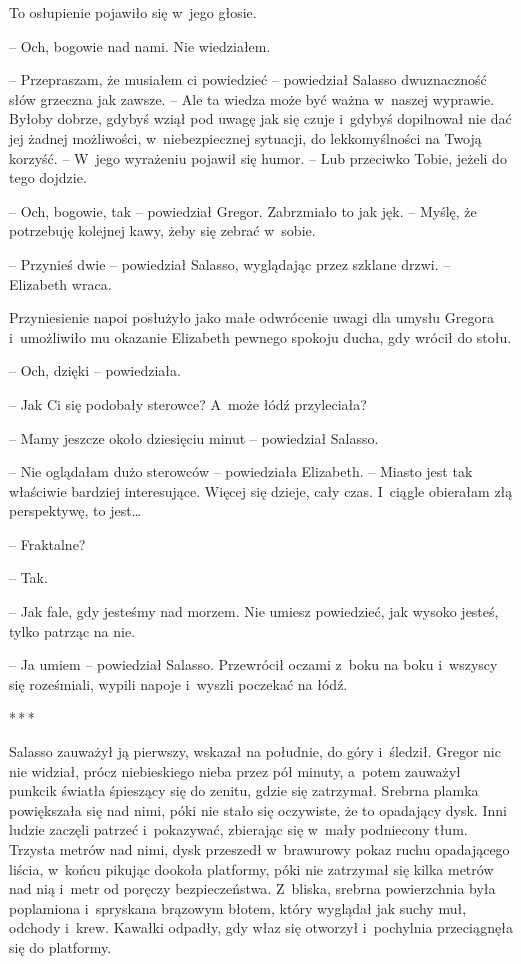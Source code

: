 \documentclass[oneside,polish,12pt,sfheadings]{mwbk}
\newcommand{\threeast}{\bigskip\par\centerline{*\,*\,*}\medskip\par}%
\begin{document}
To osłupienie pojawiło się w~jego głosie.

-- Och, bogowie nad nami. Nie wiedziałem.

-- Przepraszam, że musiałem ci powiedzieć -- powiedział Salasso
dwuznaczność słów grzeczna jak zawsze. -- Ale ta wiedza może być ważna w~naszej wyprawie. Byłoby dobrze, gdybyś wziął pod uwagę jak się czuje i~gdybyś dopilnował nie dać jej żadnej możliwości, w~niebezpiecznej
sytuacji, do lekkomyślności na Twoją korzyść. -- W~jego wyrażeniu pojawił
się humor. -- Lub przeciwko Tobie, jeżeli do tego dojdzie.

-- Och, bogowie, tak -- powiedział Gregor. Zabrzmiało to jak jęk. -- Myślę,
że potrzebuję kolejnej kawy, żeby się zebrać w~sobie.

-- Przynieś dwie -- powiedział Salasso, wyglądając przez szklane drzwi. --
Elizabeth wraca.

Przyniesienie napoi posłużyło jako małe odwrócenie uwagi dla umysłu
Gregora i~umożliwiło mu okazanie Elizabeth pewnego spokoju ducha, gdy
wrócił do stołu.

-- Och, dzięki -- powiedziała.

-- Jak Ci się podobały sterowce? A~może łódź przyleciała?

-- Mamy jeszcze około dziesięciu minut -- powiedział Salasso.

-- Nie oglądałam dużo sterowców -- powiedziała Elizabeth. -- Miasto jest
tak właściwie bardziej interesujące. Więcej się dzieje, cały czas. I~ciągle obierałam złą perspektywę, to jest\ldots

-- Fraktalne?

-- Tak. 

-- Jak fale, gdy jesteśmy nad morzem. Nie umiesz powiedzieć, jak
wysoko jesteś, tylko patrząc na nie.

-- Ja umiem -- powiedział Salasso. Przewrócił oczami z~boku na boku i~wszyscy się roześmiali, wypili napoje i~wyszli poczekać na łódź.

\threeast

Salasso zauważył ją pierwszy, wskazał na południe, do góry i~śledził.
Gregor nic nie widział, prócz niebieskiego nieba przez pół minuty, a~potem zauważył punkcik światła śpieszący się do zenitu, gdzie się
zatrzymał. Srebrna plamka powiększała się nad nimi, póki nie stało się
oczywiste, że to opadający dysk. Inni ludzie zaczęli patrzeć i~pokazywać, zbierając się w~mały podniecony tłum. Trzysta metrów nad
nimi, dysk przeszedł w~brawurowy pokaz ruchu opadającego liścia, w~końcu
pikując dookoła platformy, póki nie zatrzymał się kilka metrów nad nią i~metr od poręczy bezpieczeństwa. Z~bliska, srebrna powierzchnia była
poplamiona i~spryskana brązowym błotem, który wyglądał jak suchy muł,
odchody i~krew. Kawałki odpadły, gdy właz się otworzył i~pochylnia
przeciągnęła się do platformy.
\end{document}
